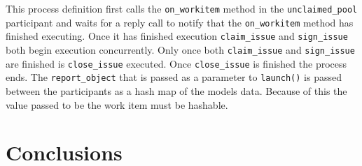 \documentclass[document.tex]{subfiles}
\begin{document}
This process definition first calls the \verb!on_workitem! method in the \verb!unclaimed_pool! participant and waits for a reply call to notify that the \verb!on_workitem! method has finished executing. Once it has finished execution \verb!claim_issue! and \verb!sign_issue! both begin execution concurrently. Only once both \verb!claim_issue! and \verb!sign_issue! are finished is \verb!close_issue! executed. Once \verb!close_issue! is finished the process ends. The \verb!report_object! that is passed as a parameter to \verb!launch()! is passed between the participants as a hash map of the models data. Because of this the value passed to be the work item must be hashable.

\section {Conclusions}
\end{document}
